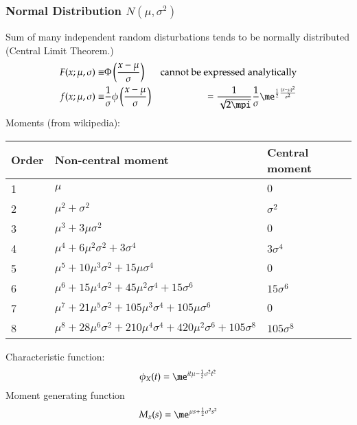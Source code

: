 \documentclass[a4paper]{article}
\numberwithin{equation}{subsection}
\begin{document}
\subsubsection{Normal Distribution $N(\mu,\sigma^2)$}
Sum of many independent random disturbations tends to be normally
distributed (Central Limit Theorem.)
\begin{align}
  F(x; \mu, \sigma) \equiv & 
  \Phi\left( \frac{x - \mu}{\sigma} \right)
  &
  \text{cannot be expressed analytically}
  \\
  f(x; \mu, \sigma) \equiv & 
  \frac{1}{\sigma} \phi\left( \frac{x - \mu}{\sigma} \right)
  &=
  \frac{1}{\sqrt{2 \mpi}}\frac{1}{\sigma}
  \me^{\scriptstyle\frac{1}{2}\frac{(x - \mu)^2}{\sigma^2}}
\end{align}
Moments (from wikipedia):
\begin{center}
  \begin{tabular}{lll}
    \toprule
    Order & Non-central moment & Central moment\\
    \midrule
    1 & $\mu$ & $0$ \\
    2 & ${\displaystyle \mu ^{2}+\sigma ^{2}} $ & ${\displaystyle \sigma ^{2}}$ \\
    3 & ${\displaystyle \mu ^{3}+3\mu \sigma ^{2}} $ & $0$ \\
    4 & ${\displaystyle \mu ^{4}+6\mu ^{2}\sigma ^{2}+3\sigma ^{4}}$ & ${\displaystyle 3\sigma ^{4}}$ \\
    5 & ${\displaystyle \mu ^{5}+10\mu ^{3}\sigma ^{2}+15\mu \sigma ^{4}}$ & $0$ \\
    6 & ${\displaystyle \mu ^{6}+15\mu ^{4}\sigma ^{2}+45\mu ^{2}\sigma ^{4}+15\sigma ^{6}}$ & ${\displaystyle 15\sigma ^{6}}$ \\
    7 & ${\displaystyle \mu ^{7}+21\mu ^{5}\sigma ^{2}+105\mu ^{3}\sigma ^{4}+105\mu \sigma ^{6}}$ & $0$ \\
    8 & ${\displaystyle \mu ^{8}+28\mu ^{6}\sigma ^{2}+210\mu ^{4}\sigma ^{4}+420\mu ^{2}\sigma ^{6}+105\sigma ^{8}}$ & ${\displaystyle 105\sigma ^{8}}$ \\
    \bottomrule
  \end{tabular}
\end{center}
Characteristic function:
\begin{equation}
  \phi_{X}(t) = \me^{i t \mu - \frac{1}{2}\sigma^2 t^2}
\end{equation}
Moment generating function
\begin{equation}
M_x (s) = \me^{\mu s + \frac{1}{2}{\sigma^2 s^2}}
\end{equation}
\end{document}
